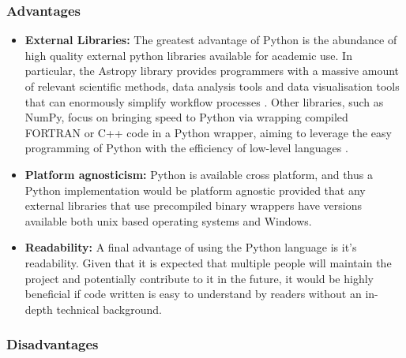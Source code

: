 \documentclass[titlesmallcaps, examinerscopy, copyrightpage]{uqthesis}
\begin{document}
\subsubsection{Advantages}

\begin{itemize}
\item \textbf{External Libraries:} The greatest advantage of Python is the abundance of  high quality external python libraries available for academic use. In particular, the Astropy library provides programmers with a massive amount of relevant scientific methods, data analysis tools and data visualisation tools that can enormously simplify workflow processes \cite{astropy}. Other libraries, such as NumPy, focus on bringing speed to Python via wrapping compiled FORTRAN or C++ code in a Python wrapper, aiming to leverage the easy programming of Python with the efficiency of low-level languages \cite{numpy}.

\item \textbf{Platform agnosticism:} Python is available cross platform, and thus a Python implementation would be platform agnostic provided that any external libraries that use precompiled binary wrappers have versions available both unix based operating systems and Windows.

\item \textbf{Readability:} A final advantage of using the Python language is it's readability. Given that it is expected that multiple people will maintain the project and potentially contribute to it in the future, it would be highly beneficial if code written is easy to understand by readers without an in-depth technical background.
\end{itemize}
  

\subsubsection{Disadvantages}
\end{document}
